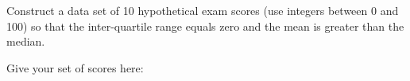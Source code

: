 
Construct a data set of 10 hypothetical exam scores (use integers
between 0 and 100) so that the inter-quartile range equals zero and
the mean is greater than the median.

Give your set of scores here: \TextEntry
